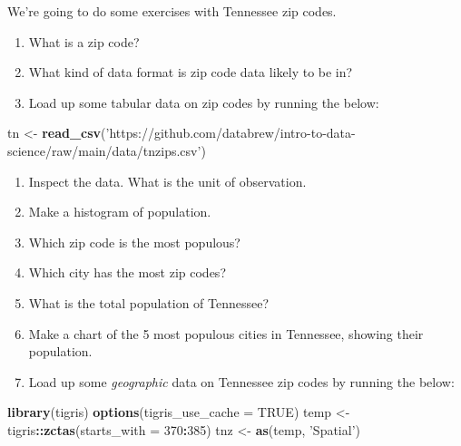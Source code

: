 \documentclass[]{book}
\newenvironment{Shaded}{\begin{snugshade}}{\end{snugshade}}
\newcommand{\DataTypeTok}[1]{\textcolor[rgb]{0.13,0.29,0.53}{#1}}
\newcommand{\DecValTok}[1]{\textcolor[rgb]{0.00,0.00,0.81}{#1}}
\newcommand{\KeywordTok}[1]{\textcolor[rgb]{0.13,0.29,0.53}{\textbf{#1}}}
\newcommand{\NormalTok}[1]{#1}
\newcommand{\OperatorTok}[1]{\textcolor[rgb]{0.81,0.36,0.00}{\textbf{#1}}}
\newcommand{\OtherTok}[1]{\textcolor[rgb]{0.56,0.35,0.01}{#1}}
\newcommand{\StringTok}[1]{\textcolor[rgb]{0.31,0.60,0.02}{#1}}
\begin{document}
We're going to do some exercises with Tennessee zip codes.

\begin{enumerate}
\def\labelenumi{\arabic{enumi}.}
\item
  What is a zip code?
\item
  What kind of data format is zip code data likely to be in?
\item
  Load up some tabular data on zip codes by running the below:
\end{enumerate}

\begin{Shaded}
\begin{Highlighting}[]
\NormalTok{tn <-}\StringTok{ }\KeywordTok{read_csv}\NormalTok{(}\StringTok{'https://github.com/databrew/intro-to-data-science/raw/main/data/tnzips.csv'}\NormalTok{)}
\end{Highlighting}
\end{Shaded}

\begin{enumerate}
\def\labelenumi{\arabic{enumi}.}
\setcounter{enumi}{3}
\item
  Inspect the data. What is the unit of observation.
\item
  Make a histogram of population.
\item
  Which zip code is the most populous?
\item
  Which city has the most zip codes?
\item
  What is the total population of Tennessee?
\item
  Make a chart of the 5 most populous cities in Tennessee, showing their population.
\item
  Load up some \emph{geographic} data on Tennessee zip codes by running the below:
\end{enumerate}

\begin{Shaded}
\begin{Highlighting}[]
\KeywordTok{library}\NormalTok{(tigris)}
\KeywordTok{options}\NormalTok{(}\DataTypeTok{tigris_use_cache =} \OtherTok{TRUE}\NormalTok{)}
\NormalTok{temp <-}\StringTok{ }\NormalTok{tigris}\OperatorTok{::}\KeywordTok{zctas}\NormalTok{(}\DataTypeTok{starts_with =} \DecValTok{370}\OperatorTok{:}\DecValTok{385}\NormalTok{)}
\NormalTok{tnz <-}\StringTok{  }\KeywordTok{as}\NormalTok{(temp, }\StringTok{'Spatial'}\NormalTok{)}
\end{Highlighting}
\end{Shaded}
\end{document}
